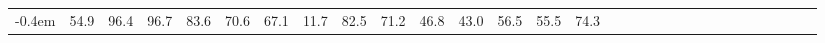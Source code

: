 \begin{table*}[]
\begin{tabular}{cc|cccccccccccccccccccccccccccc}
-0.4em} & \hspace{-0.9em}54.9\hspace{-0.4em} & \hspace{-0.9em}96.4\hspace{-0.4em} & \hspace{-0.9em}96.7\hspace{-0.4em} & \hspace{-0.9em}83.6\hspace{-0.4em} & \hspace{-0.9em}70.6\hspace{-0.4em} & \hspace{-0.9em}67.1\hspace{-0.4em} & \hspace{-0.9em}11.7\hspace{-0.4em} & \hspace{-0.9em}82.5\hspace{-0.4em} & \hspace{-0.9em}71.2\hspace{-0.4em} & \hspace{-0.9em}46.8\hspace{-0.4em} & \hspace{-0.9em}43.0\hspace{-0.4em} & \hspace{-0.9em}56.5\hspace{-0.4em} & \hspace{-0.9em}55.5\hspace{-0.4em} & \hspace{-0.9em}74.3\hspace{-0.4em} 
        \\

\end{tabular}
\end{table*}
